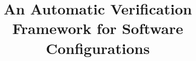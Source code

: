 \documentclass[letterpaper,twocolumn,10pt]{article}
\begin{document}
\setlength{\pdfpageheight}{\paperheight}
\setlength{\pdfpagewidth}{\paperwidth}





\title{An Automatic Verification Framework for Software Configurations}

\author{~}

\maketitle





%



%











\end{document}
